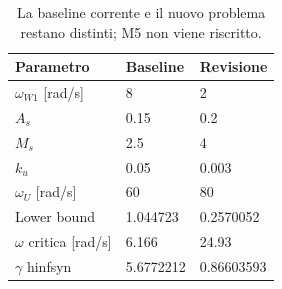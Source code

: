 \begin{table}[htbp]\centering\small
\begin{tabular}{lll}\toprule
Parametro & Baseline & Revisione\\\midrule
$\omega_{W1}$ [rad/s] & 8 & 2\\
$A_s$ & 0.15 & 0.2\\
$M_s$ & 2.5 & 4\\
$k_u$ & 0.05 & 0.003\\
$\omega_U$ [rad/s] & 60 & 80\\
Lower bound & 1.044723 & 0.2570052\\
$\omega$ critica [rad/s] & 6.166 & 24.93\\
$\gamma$ hinfsyn & 5.6772212 & 0.86603593\\
\bottomrule\end{tabular}
\caption{La baseline corrente e il nuovo problema restano distinti; M5 non viene riscritto.}\end{table}
